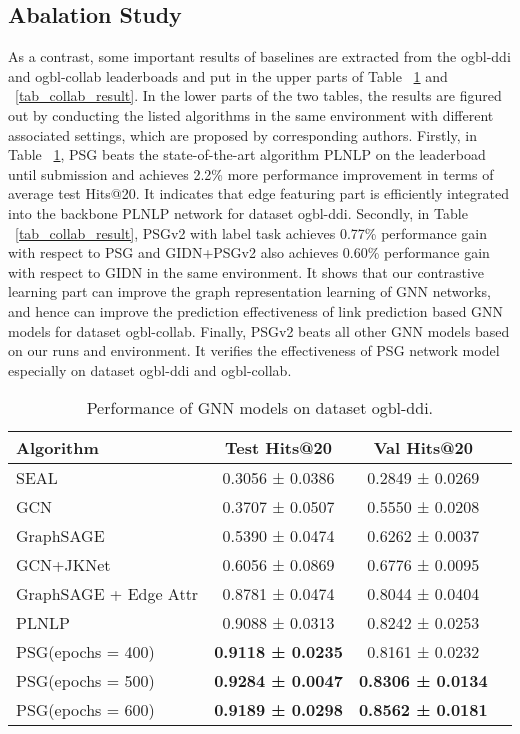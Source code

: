 \documentclass[sigconf]{acmart}
\begin{document}
\subsection{Abalation Study} As a contrast, some important results of baselines are extracted from the ogbl-ddi and ogbl-collab leaderboads and put in the upper parts of Table ~\ref{tab_ddi_result}  and ~\ref{tab_collab_result}. In the lower parts of the two tables, the results are figured out by conducting the listed algorithms in the same environment with different associated settings, which are proposed by corresponding authors. Firstly, in Table ~\ref{tab_ddi_result}, PSG beats the state-of-the-art algorithm PLNLP on the leaderboad until submission and achieves  2.2\% more performance improvement in terms of average test Hits@20. It indicates that edge featuring part is efficiently integrated into the backbone PLNLP network for dataset ogbl-ddi. Secondly, in Table ~\ref{tab_collab_result}, PSGv2 with label task achieves 0.77\% performance gain with respect to PSG and GIDN+PSGv2 also achieves 0.60\% performance gain with respect to GIDN in the same environment. It shows that our contrastive learning part can improve the graph representation learning of GNN networks, and hence can improve the prediction effectiveness of link prediction based GNN models for dataset ogbl-collab. Finally, PSGv2 beats all other GNN models based on our runs and environment. It verifies the effectiveness of PSG network model especially on dataset ogbl-ddi and ogbl-collab.




\begin{table}[htbp]
    \centering
    \caption{Performance of GNN models on dataset ogbl-ddi.}\label{tab_ddi_result}
    \begin{tabular}{lccc}
    \hline
    Algorithm                                    & Test Hits@20  & Val Hits@20             \\ \hline
    SEAL                                & 0.3056 ± 0.0386          & 0.2849 ± 0.0269         \\
    GCN       & 0.3707 ± 0.0507         & 0.5550 ± 0.0208          \\
    GraphSAGE & 0.5390 ± 0.0474         & 0.6262 ± 0.0037        \\
    GCN+JKNet    & 0.6056 ± 0.0869          & 0.6776 ± 0.0095          \\
    GraphSAGE + Edge Attr   & 0.8781 ± 0.0474 & 0.8044 ± 0.0404 \\
    PLNLP   & 0.9088 ± 0.0313 & 0.8242 ± 0.0253 \\  \hline
    PSG(epochs = 400)   & \textbf{0.9118 ± 0.0235} & 0.8161 ± 0.0232 \\
    PSG(epochs = 500)   & \textbf{0.9284 ± 0.0047} & \textbf{0.8306 ± 0.0134} \\
    PSG(epochs = 600)   & \textbf{0.9189 ± 0.0298} & \textbf{0.8562 ± 0.0181} \\ \hline
    \end{tabular}
\end{table}
\end{document}
